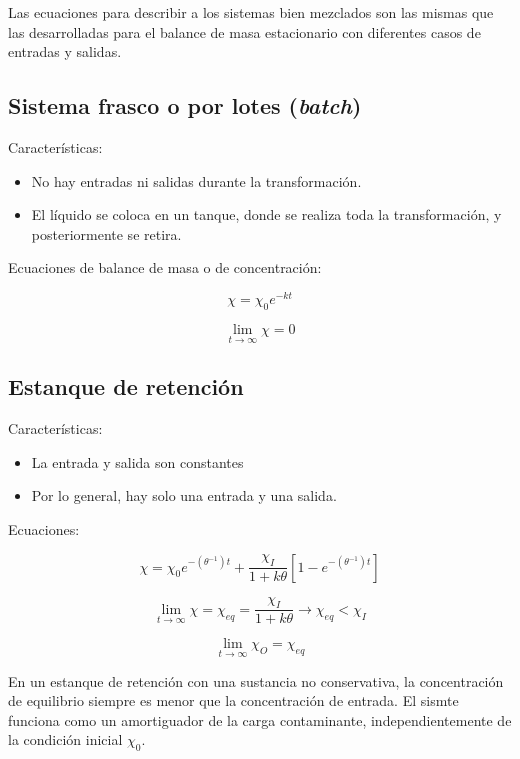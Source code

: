 \documentclass[11pt]{article}
\begin{document}
Las ecuaciones para describir a los sistemas bien mezclados son las mismas que las desarrolladas para el balance de masa estacionario con diferentes casos de entradas y salidas.

\subsection{Sistema frasco o por lotes (\textit{batch})}

Características:

\begin{itemize}
    \item No hay entradas ni salidas durante la transformación.
    \item El líquido se coloca en un tanque, donde se realiza toda la transformación, y posteriormente se retira.
\end{itemize}

Ecuaciones de balance de masa o de concentración:

\[ \chi = \chi_0 e^{-kt} \]

\[ \lim_{ t \rightarrow \infty } \chi = 0 \]

\subsection{Estanque de retención}

Características:

\begin{itemize}
    \item La entrada y salida son constantes
    \item Por lo general, hay solo una entrada y una salida.
\end{itemize}

Ecuaciones:

\[ \chi = \chi_0 e^{ - \left( \theta^{-1} \right) t } + \frac{\chi_I}{ 1 + k \theta } \left[ 1 - e^{  - \left( \theta^{-1} \right) t } \right] \]

\[ \lim_{ t \rightarrow \infty } \chi = \chi_{eq} = \frac{\chi_I}{ 1 + k \theta } \longrightarrow \chi_{eq} < \chi_I \]

\[ \lim_{ t \rightarrow \infty } \chi_O = \chi_{eq} \]

En un estanque de retención con una sustancia no conservativa, la concentración de equilibrio siempre es menor que la concentración de entrada. El sismte funciona como un amortiguador de la carga contaminante, independientemente de la condición inicial \( \chi_0 \).
\end{document}
